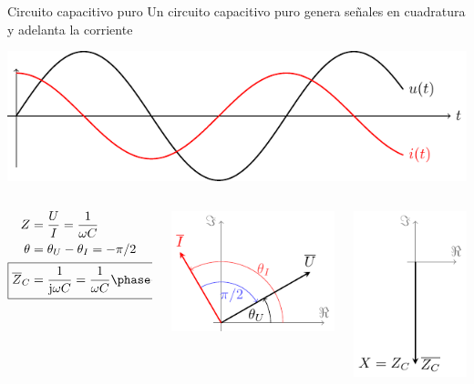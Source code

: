 \documentclass[aspectratio=169, xcolor={usenames,svgnames,dvipsnames}]{beamer}
\begin{document}
\begin{frame}{Circuito capacitivo puro}
Un circuito capacitivo puro genera \alert{señales en cuadratura} y \alert{adelanta la corriente}

\begin{center}
\includegraphics[height=0.3\textheight]{../figs/capacitivoPuro.pdf}
\end{center}

\begin{columns}
\begin{column}{0.3\columnwidth}
\begin{align*}
  Z &= \frac{U}{I} = \frac{1}{\omega C}\\
  \theta &= \theta_U - \theta_I = - \pi/2\\
  \Aboxed{\overline{Z}_C &= \frac{1}{\mathrm{j}\omega C} = \frac{1}{\omega C}\phase{\ang{-90}}}
\end{align*}
\end{column}


\begin{column}{0.4\columnwidth}
\begin{center}
\includegraphics[height=0.4\textheight]{../figs/fasorCondensador_VI.pdf}
\end{center}
\end{column}


\begin{column}{0.3\columnwidth}
\begin{center}
\includegraphics[height=0.4\textheight]{../figs/fasorCondensador.pdf}
\end{center}
\end{column}
\end{columns}
\end{frame}
\end{document}
